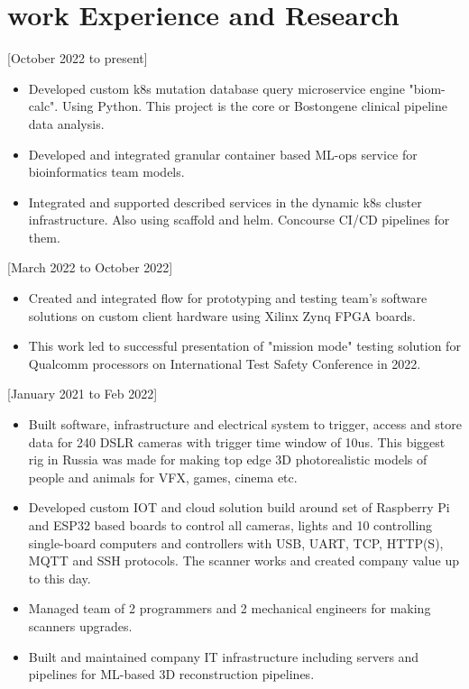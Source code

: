 \documentclass{article}
\begin{document}
\section{work Experience and Research}


[October 2022 to present]
   \begin{itemize}
      \item Developed custom k8s mutation database query microservice engine "biom-calc". Using Python. This project is the core or Bostongene clinical pipeline data analysis. 
      \item Developed and integrated granular container based ML-ops service for bioinformatics team models.
      \item Integrated and supported described services in the dynamic k8s cluster infrastructure. Also using scaffold and helm. Concourse CI/CD pipelines for them.
    \end{itemize}

[March 2022 to October 2022]
   \begin{itemize}
      \item Created and integrated flow for prototyping and testing team's software solutions on custom client hardware using Xilinx Zynq FPGA boards.
      \item This work led to successful presentation of "mission mode" testing solution for Qualcomm processors on International Test Safety Conference in 2022.
   \end{itemize}  

[January 2021 to Feb 2022]
\begin{itemize}
   \item Built software, infrastructure and electrical system to trigger, access and store data for 240 DSLR cameras with trigger time window of 10us. This biggest rig in Russia was made for making top edge 3D photorealistic models of people and animals for VFX, games, cinema etc.
   \item Developed custom IOT and cloud solution build around set of Raspberry Pi and ESP32 based boards to control all cameras, lights and 10 controlling single-board computers and controllers with USB, UART, TCP, HTTP(S), MQTT and SSH protocols. The scanner works and created company value up to this day.
   \item Managed team of 2 programmers and 2 mechanical engineers for making scanners upgrades.
   \item Built and maintained company IT infrastructure including servers and pipelines for ML-based 3D reconstruction pipelines.
\end{itemize}
\end{document}
